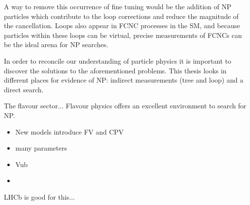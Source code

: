 A way to remove this occurrence of fine tuning would be the addition of NP particles which
contribute to the loop corrections and reduce the magnitude of the cancellation.
Loops also appear in FCNC processes in the SM, and because particles within these loops can be
virtual, precise measurements of FCNCs can be the ideal arena for NP searches.


In order to reconcile our understanding of particle physics it is important to discover the
solutions to the aforementioned problems.
This thesis looks in different places for evidence of NP: indirect measurements (tree and loop) and
a direct search.



The flavour sector...
Flavour physics offers an excellent environment to search for NP.

\begin{itemize}
  \item New models introduce FV and CPV
  \item many parameters
  \item Vub
  \item
\end{itemize}

LHCb is good for this...


%




